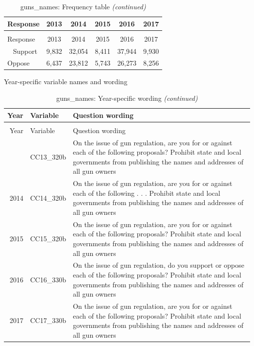 \documentclass[12pt]{article}
\begin{document}
\begin{longtable}[t]{lccccc}
\caption{\label{tab:unnamed-chunk-4}guns\_names: Frequency table}\\
\toprule
Response & 2013 & 2014 & 2015 & 2016 & 2017\\
\midrule
\endfirsthead
\caption[]{guns\_names: Frequency table \textit{(continued)}}\\
\toprule
Response & 2013 & 2014 & 2015 & 2016 & 2017\\
\midrule
\endhead
\
\endfoot
\bottomrule
\endlastfoot
Support & 9,832 & 32,054 & 8,411 & 37,944 & 9,930\\
Oppose & 6,437 & 23,812 & 5,743 & 26,273 & 8,256\\*
\end{longtable}

\endgroup{}

Year-specific variable names and wording

\begin{longtable}[t]{rl>{\raggedright\arraybackslash}p{10cm}}
\caption{\label{tab:unnamed-chunk-4}guns\_names: Year-specific wording}\\
\toprule
Year & Variable & Question wording\\
\midrule
\endfirsthead
\caption[]{guns\_names: Year-specific wording \textit{(continued)}}\\
\toprule
Year & Variable & Question wording\\
\midrule
\endhead
\
\endfoot
\bottomrule
\endlastfoot
2013 & CC13\_320b & On the issue of gun regulation, are you for or against each of the following proposals? Prohibit state and local governments from publishing the names and addresses of all gun owners\\
2014 & CC14\_320b & On the issue of gun regulation, are you for or against each of the following . . . Prohibit state and local governments from publishing the names and addresses of all gun owners\\
2015 & CC15\_320b & On the issue of gun regulation, are you for or against each of the following proposals? Prohibit state and local governments from publishing the names and addresses of all gun owners\\
2016 & CC16\_330b & On the issue of gun regulation, do you support or oppose each of the following proposals? Prohibit state and local governments from publishing the names and addresses of all gun owners\\
2017 & CC17\_330b & On the issue of gun regulation, are you for or against each of the following proposals? Prohibit state and local governments from publishing the names and addresses of all gun owners\\*
\end{longtable}
\end{document}

